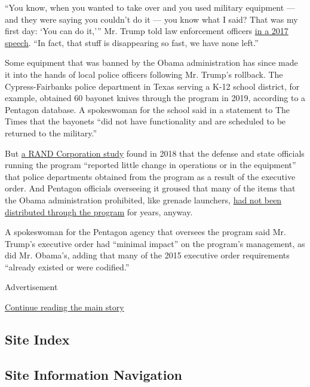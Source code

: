 ``You know, when you wanted to take over and you used military equipment
--- and they were saying you couldn't do it --- you know what I said?
That was my first day: `You can do it,''' Mr. Trump told law enforcement
officers
\href{https://www.nytimes.com/2017/07/28/us/politics/trump-immigration-gang-violence-long-island.html}{in
a 2017 speech}. ``In fact, that stuff is disappearing so fast, we have
none left.''

Some equipment that was banned by the Obama administration has since
made it into the hands of local police officers following Mr. Trump's
rollback. The Cypress-Fairbanks police department in Texas serving a
K-12 school district, for example, obtained 60 bayonet knives through
the program in 2019, according to a Pentagon database. A spokeswoman for
the school said in a statement to The Times that the bayonets ``did not
have functionality and are scheduled to be returned to the military.''

But \href{https://www.rand.org/pubs/research_reports/RR2464.html}{a RAND
Corporation study} found in 2018 that the defense and state officials
running the program ``reported little change in operations or in the
equipment'' that police departments obtained from the program as a
result of the executive order. And Pentagon officials overseeing it
groused that many of the items that the Obama administration prohibited,
like grenade launchers,
\href{https://www.dla.mil/DispositionServices/Offers/Reutilization/LawEnforcement/ProgramFAQs.aspx\#q10}{had
not been distributed through the program} for years, anyway.

A spokeswoman for the Pentagon agency that oversees the program said Mr.
Trump's executive order had ``minimal impact'' on the program's
management, as did Mr. Obama's, adding that many of the 2015 executive
order requirements ``already existed or were codified.''

Advertisement

\protect\hyperlink{after-bottom}{Continue reading the main story}

\hypertarget{site-index}{%
\subsection{Site Index}\label{site-index}}

\hypertarget{site-information-navigation}{%
\subsection{Site Information
Navigation}\label{site-information-navigation}}

